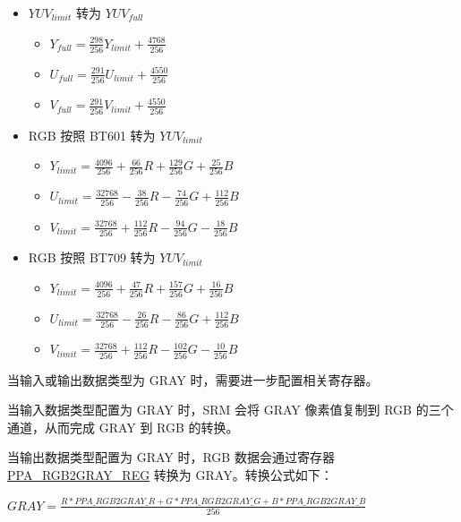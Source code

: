 \documentclass[main\_\_CN.tex]{subfiles}
\begin{document}
\begin{itemize}
    \item $YUV_{limit}$ 转为 $YUV_{full}$
        \begin{itemize}
            \item $Y_{full} = \frac{298}{256} Y_{limit} + \frac{4768}{256}$
            \item $U_{full} = \frac{291}{256} U_{limit} + \frac{4550}{256}$
            \item $V_{full} = \frac{291}{256} V_{limit} + \frac{4550}{256}$
        \end{itemize}
    \item RGB 按照 BT601 转为 $YUV_{limit}$
        \begin{itemize}
            \item $Y_{limit} = \frac{4096}{256} + \frac{66}{256}R + \frac{129}{256}G + \frac{25}{256}B$
            \item $U_{limit} = \frac{32768}{256} - \frac{38}{256}R - \frac{74}{256}G + \frac{112}{256}B$
            \item $V_{limit} = \frac{32768}{256} + \frac{112}{256}R - \frac{94}{256}G - \frac{18}{256}B$
        \end{itemize}
    \item RGB 按照 BT709 转为 $YUV_{limit}$
        \begin{itemize}
            \item $Y_{limit} = \frac{4096}{256} + \frac{47}{256}R + \frac{157}{256}G + \frac{16}{256}B$
            \item $U_{limit} = \frac{32768}{256} - \frac{26}{256}R - \frac{86}{256}G + \frac{112}{256}B$
            \item $V_{limit} = \frac{32768}{256} + \frac{112}{256}R - \frac{102}{256}G - \frac{10}{256}B$
        \end{itemize}
\end{itemize}

当输入或输出数据类型为 GRAY 时，需要进一步配置相关寄存器。

当输入数据类型配置为 GRAY 时，SRM 会将 GRAY 像素值复制到 RGB 的三个通道，从而完成 GRAY 到 RGB 的转换。

当输出数据类型配置为 GRAY 时，RGB 数据会通过寄存器 \hyperref[regdesc:PPARGB2GRAYREG]{PPA\_RGB2GRAY\_REG} 转换为 GRAY。转换公式如下：

$GRAY = \frac{R * \hyperref[fielddesc:PPARGB2GRAYR]{PPA\_RGB2GRAY\_R} + G * \hyperref[fielddesc:PPARGB2GRAYG]{PPA\_RGB2GRAY\_G} + B * \hyperref[fielddesc:PPARGB2GRAYB]{PPA\_RGB2GRAY\_B}}{256}$
\end{document}
